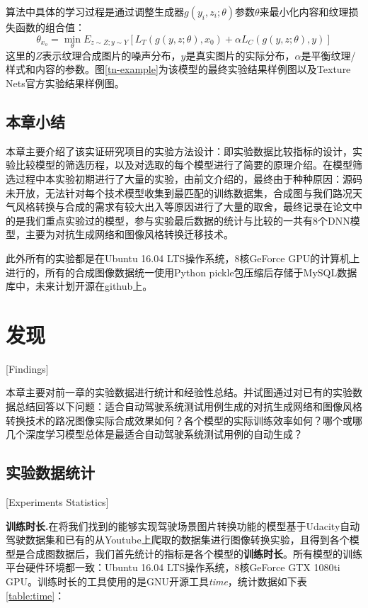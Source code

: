 算法中具体的学习过程是通过调整生成器$g(y_i,z_i;\theta)$参数$\theta$来最小化内容和纹理损失函数的组合值：
$$\theta_{x_o}=\min_{\theta}E_{z\sim Z;y\sim Y}[L_T(g(y,z;\theta),x_0)+\alpha L_C(g(y,z;\theta),y)]$$
这里的$Z$表示纹理合成图片的噪声分布，$y$是真实图片的实际分布，$\alpha$是平衡纹理/样式和内容的参数。图\ref{tn-example}为该模型的最终实验结果样例图以及Texture Nets官方实验结果样例图。


\section{本章小结}

本章主要介绍了该实证研究项目的实验方法设计：即实验数据比较指标的设计，实验比较模型的筛选历程，以及对选取的每个模型进行了简要的原理介绍。在模型筛选过程中本实验初期进行了大量的实验，由前文介绍的，最终由于种种原因：源码未开放，无法针对每个技术模型收集到最匹配的训练数据集，合成图与我们路况天气风格转换与合成的需求有较大出入等原因进行了大量的取舍，最终记录在论文中的是我们重点实验过的模型，参与实验最后数据的统计与比较的一共有8个DNN模型，主要为对抗生成网络和图像风格转换迁移技术。

此外所有的实验都是在Ubuntu 16.04 LTS操作系统，8核GeForce GPU的计算机上进行的，所有的合成图像数据统一使用Python pickle包压缩后存储于MySQL数据库中，未来计划开源在github上。


\chapter{发现}[Findings]

本章主要对前一章的实验数据进行统计和经验性总结。并试图通过对已有的实验数据总结回答以下问题：适合自动驾驶系统测试用例生成的对抗生成网络和图像风格转换技术的路况图像实际合成效果如何？各个模型的实际训练效率如何？哪个或哪几个深度学习模型总体是最适合自动驾驶系统测试用例的自动生成？

\section{实验数据统计}[Experiments Statistics]

\textbf{训练时长.}\quad 在将我们找到的能够实现驾驶场景图片转换功能的模型基于Udacity自动驾驶数据集\cite{udacity_dataset}和已有的从Youtube上爬取的数据集进行图像转换实验，且得到各个模型是合成图数据后，我们首先统计的指标是各个模型的\textbf{训练时长}。所有模型的训练平台硬件环境都一致：Ubuntu 16.04 LTS操作系统，8核GeForce GTX 1080ti GPU。训练时长的工具使用的是GNU开源工具\textit{time}，统计数据如下表\ref{table:time}：

